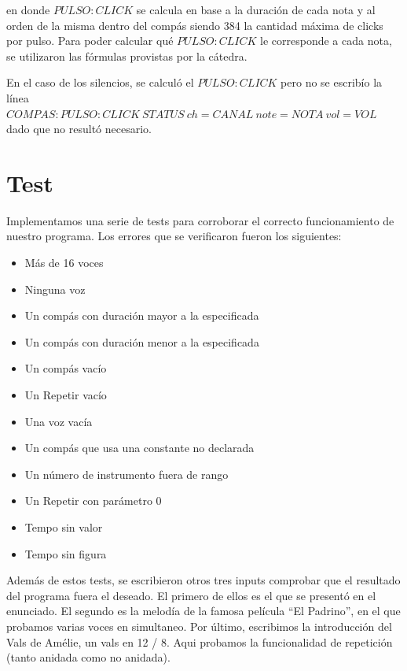 \documentclass[a4paper, 10pt, twoside]{article}
\begin{document}
en donde $PULSO:CLICK$ se calcula en base a la duración de cada nota y al orden de la misma dentro del compás siendo 384 la cantidad máxima de clicks por pulso. Para poder calcular qué $PULSO:CLICK$ le corresponde a cada nota, se utilizaron las fórmulas provistas por la cátedra.

En el caso de los silencios, se calculó el $PULSO:CLICK$ pero no se escribío la línea $COMPAS:PULSO:CLICK\ STATUS\ ch=CANAL\ note=NOTA\ vol=VOL$ dado que no resultó necesario.


\section{Test}
Implementamos una serie de tests para corroborar el correcto funcionamiento de nuestro programa. Los errores que se verificaron fueron los siguientes:

\begin{itemize}
\item Más de 16 voces
\item Ninguna voz
\item Un compás con duración mayor a la especificada
\item Un compás con duración menor a la especificada
\item Un compás vacío 
\item Un Repetir vacío
\item Una voz vacía 
\item Un compás que usa una constante no declarada
\item Un número de instrumento fuera de rango
\item Un Repetir con parámetro 0
\item Tempo sin valor
\item Tempo sin figura

\end{itemize}
Además de estos tests, se escribieron otros tres inputs comprobar que el resultado del programa fuera el deseado. El primero de ellos es el que se presentó en el enunciado. El segundo es la melodía de la famosa película ``El Padrino'', en el que probamos varias voces en simultaneo. Por último, escribimos la introducción del Vals de Amélie, un vals en 12 / 8. Aqui probamos la funcionalidad de repetición (tanto anidada como no anidada).
\end{document}
